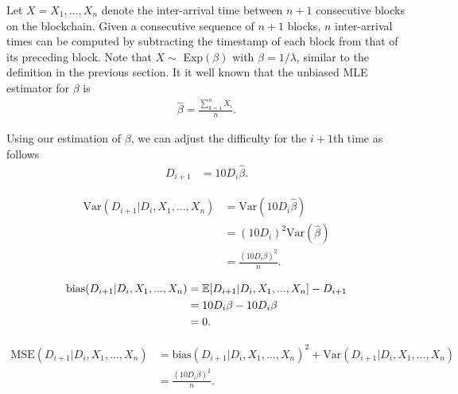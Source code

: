 
 Let $X = X_1, \ldots, X_n$ denote the inter-arrival time between $n+1$ consecutive blocks on the blockchain. Given a consecutive sequence of $n+1$ blocks, $n$ inter-arrival times can be computed by subtracting the timestamp of each block from that of its preceding block. Note that $X \sim$ Exp$(\beta)$ with $\beta = 1/\lambda$, similar to the definition in the previous section. It it well known that the unbiased MLE estimator for $\beta$ is
\begin{align}
\hat{\beta} = \frac{\sum_{k=1}^{n} X_i}{n}.
\end{align}

Using our estimation of $\beta$, we can adjust the difficulty for the $i+1$th time as follows 
\begin{align}
D_{i+1} &= 10 D_i \hat{\beta}.
\end{align}


\begin{align}
\text{Var}(D_{i+1} | D_{i}, X_1, \dots, X_{n}) &= \text{Var}(10 D_i \hat{\beta}) \\
&= (10 D_i)^2 \text{Var}(\hat{\beta}) \\
&= \frac{(10 D_i\beta)^2}{n}.
\end{align}

\begin{align}
\text{bias}(D_{i+1}|D_i,X_1,...,X_n) &= \operatorname{\mathbb{E}}[D_{i+1}|D_i,X_1,...,X_n] - D_{i+1} \\
&= 10 D_i\beta - 10 D_i\beta \\
&= 0.
\end{align}

\begin{align}
\text{MSE}(D_{i+1}|D_i,X_1,...,X_n) &= \text{bias}(D_{i+1}|D_i,X_1,...,X_n)^2 + \text{Var}(D_{i+1}|D_i,X_1,...,X_n) \\
&= \frac{(10 D_i\beta)^2}{n}.
\end{align}


